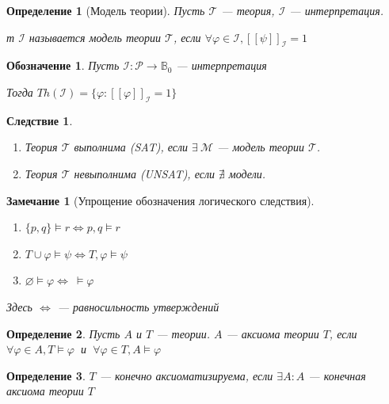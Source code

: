 \documentclass[12pt]{article}
\newtheorem{definition}{Определение}
\newtheorem{corollary}{Следствие}
\newtheorem{remark}{Замечание}
\newtheorem{notation}{Обозначение}
\begin{document}
\begin{definition}[Модель теории]
	Пусть $\mathcal{T}$ --- теория, $\mathcal{I}$ --- интерпретация.

	т
	$\mathcal{I}$ называется модель теории $\mathcal{T}$, если $\forall \varphi \in \mathcal{I}, [\![ \psi ]\!]_{\mathcal{I}} = 1$
\end{definition}

\begin{notation}
	Пусть $\mathcal{I}: \mathcal{P} \to \mathbb{B}_0$ --- интерпретация

	Тогда
	$Th(\mathcal{I}) = \{\varphi : [\![ \varphi ]\!]_{\mathcal{I}} = 1\}$
\end{notation}

\begin{corollary}
	\leavevmode
	\begin{enumerate}
		\item Теория $\mathcal{T}$ выполнима (SAT), если $\exists \ \mathcal{M}$ --- модель теории $\mathcal{T}$.
		\item Теория $\mathcal{T}$ невыполнима (UNSAT), если $\nexists$ модели.
	\end{enumerate}
\end{corollary}
\begin{remark}[Упрощение обозначения логического следствия]
	\leavevmode
	\begin{enumerate}
		\item $\{p, q\} \models r \iff p, q \models r$
		\item $T \cup \varphi \models \psi \iff T , \varphi \models \psi$
		\item $\varnothing \models \varphi \iff \ \models \varphi$
	\end{enumerate}
	Здесь $\iff$ --- равносильность утверждений
\end{remark}

\begin{definition}
	Пусть $A$ и $T$ --- теории.
	$A$ --- аксиома теории $T$,
	если $\forall \varphi \in A, T \models \varphi \ $  и  $ \ \forall \varphi \in T, A \models \varphi$
\end{definition}
\begin{definition}
	$T$  --- конечно аксиоматизируема, если $\exists A : A$ --- конечная аксиома теории $T$
\end{definition}
\end{document}
